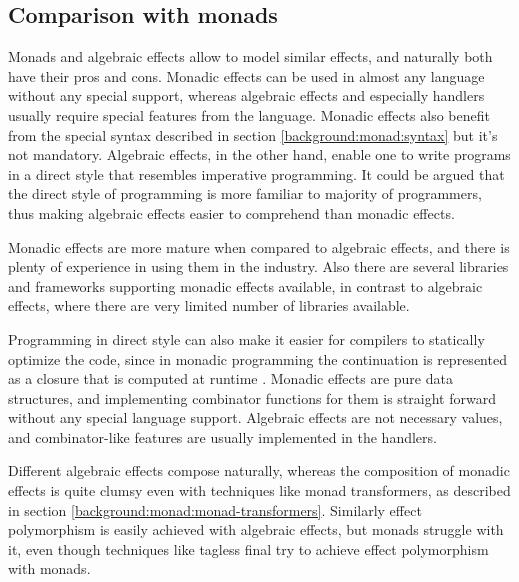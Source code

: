 \subsection{Comparison with monads}
Monads and algebraic effects allow to model similar effects, and naturally both have their pros and cons. Monadic effects can be used in almost any language without any special support, whereas algebraic effects and especially handlers usually require special features from the language. Monadic effects also benefit from the special syntax described in section \ref{background:monad:syntax} but it's not mandatory. Algebraic effects, in the other hand, enable one to write programs in a direct style that resembles imperative programming. It could be argued that the direct style of programming is more familiar to majority of programmers, thus making algebraic effects easier to comprehend than monadic effects.

Monadic effects are more mature when compared to algebraic effects, and there is plenty of experience in using them in the industry. Also there are several libraries and frameworks supporting monadic effects available, in contrast to algebraic effects, where there are very limited number of libraries available.

Programming in direct style can also make it easier for compilers to statically optimize the code, since in monadic programming the continuation is represented as a closure that is computed at runtime . Monadic effects are pure data structures, and implementing combinator functions for them is straight forward without any special language support. Algebraic effects are not necessary values, and combinator-like features are usually implemented in the handlers.

Different algebraic effects compose naturally, whereas the composition of monadic effects is quite clumsy even with techniques like monad transformers, as described in section \ref{background:monad:monad-transformers}. Similarly effect polymorphism is easily achieved with algebraic effects, but monads struggle with it, even though techniques like tagless final try to achieve effect polymorphism with monads.